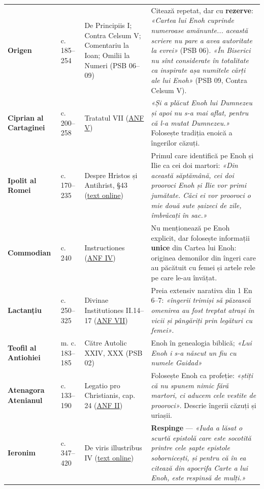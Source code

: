 \documentclass[12pt,a4paper,twoside,openany]{book}
\begin{document}
\begin{longtable}{L{0.8cm}L{0.8cm}L{3.1cm}L{10.0cm}}
\textbf{Origen} & c. 185–254 & De Principiis I; Contra Celsum V; Comentariu la Ioan; Omilii la Numeri (PSB 06–09) & Citează repetat, dar cu \textbf{rezerve}: \textit{«Cartea lui Enoh cuprinde numeroase amănunte... această scriere nu pare a avea autoritate la evrei»} (PSB 06). \textit{«În Biserici nu sînt considerate în totalitate ca inspirate așa numitele cărți ale lui Enoh»} (PSB 09, Contra Celsum V). \\
\textbf{Ciprian al Cartaginei} & c. 200–258 & Tratatul VII (\href{https://ccel.org/ccel/schaff/anf05}{ANF V}) & \textit{«Și a plăcut Enoh lui Dumnezeu și apoi nu s-a mai aflat, pentru că l-a mutat Dumnezeu.»} Folosește tradiția enoică a îngerilor căzuți. \\
\textbf{Ipolit al Romei} & c. 170–235 & Despre Hristos și Antihrist, §43 (\href{https://andrewjacobs.org/translations/hippolytus.html}{text online}) & Primul care identifică pe Enoh și Ilie ca cei doi martori: \textit{«Din această săptămână, cei doi prooroci Enoh și Ilie vor primi jumătate. Căci ei vor prooroci o mie două sute șaizeci de zile, îmbrăcați în sac.»} \\
\textbf{Commodian} & c. 240 & Instructiones (\href{https://ccel.org/ccel/schaff/anf04}{ANF IV}) & Nu menționează pe Enoh explicit, dar folosește informații \textbf{unice} din Cartea lui Enoh: originea demonilor din îngeri care au păcătuit cu femei și artele rele pe care le-au învățat. \\
\textbf{Lactanțiu} & c. 250–325 & Divinae Institutiones II.14–17 (\href{https://www.newadvent.org/fathers/07012.htm}{ANF VII}) & Preia extensiv narativa din 1 En 6–7: \textit{«îngerii trimiși să păzească omenirea au fost trep­tat atrași în vicii și pângăriți prin legături cu femei»}. \\
\textbf{Teofil al Antiohiei} & m. c. 183–185 & Către Autolic XXIV, XXX (PSB 02) & Enoh în genealogia biblică; \textit{«Lui Enoh i s-a născut un fiu cu numele Gaidad»} \\
\textbf{Atenagora Atenianul} & c. 133–190 & Legatio pro Christianis, cap. 24 (\href{https://www.newadvent.org/fathers/0205.htm}{ANF II}) & Folosește Enoh ca profeție: \textit{«știți că nu spunem nimic fără martori, ci aducem cele vestite de prooroci»}. Descrie îngerii căzuți și uriașii. \\
\textbf{Ieronim} & c. 347–420 & De viris illustribus IV (\href{https://www.newadvent.org/fathers/2708.htm}{text online}) & \textbf{Respinge} — \textit{«Iuda a lăsat o scurtă epistolă care este socotită printre cele șapte epistole sobornicești, și pentru că în ea citează din apocrifa Carte a lui Enoh, este respinsă de mulți.»} \\

\end{longtable}
\end{document}
